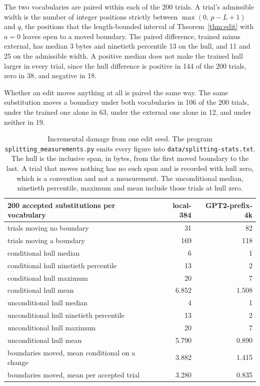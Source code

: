 \documentclass[11pt,a4paper]{article}
\theoremstyle{definition}
\theoremstyle{plain}
\newcommand{\code}[1]{\texttt{#1}}
\begin{document}
The two vocabularies are paired within each of the 200 trials. A trial's admissible width is the number of integer
positions strictly between $\max(0,\, p - L + 1)$ and $q$, the positions that the length-bounded interval of
Theorem~\ref{thm:edit} with $a = 0$ leaves open to a moved boundary. The paired difference, trained minus external, has
median 3 bytes and ninetieth percentile 13 on the hull, and 11 and 25 on the admissible width. A positive median does
not make the trained hull larger in every trial, since the hull difference is positive in 144 of the 200 trials, zero in
38, and negative in 18.

Whether an edit moves anything at all is paired the same way. The same substitution moves a boundary under both
vocabularies in 106 of the 200 trials, under the trained one alone in 63, under the external one alone in 12, and under
neither in 19.

\begin{table}[!htbp]
\centering
\begin{tabular}{@{}lrr@{}}
\toprule
200 accepted substitutions per vocabulary & local-384 & GPT2-prefix-4k \\
\midrule
trials moving no boundary & 31 & 82 \\
trials moving a boundary & 169 & 118 \\
\midrule
conditional hull median & 6 & 1 \\
conditional hull ninetieth percentile & 13 & 2 \\
conditional hull maximum & 20 & 7 \\
conditional hull mean & 6.852 & 1.508 \\
\midrule
unconditional hull median & 4 & 1 \\
unconditional hull ninetieth percentile & 13 & 2 \\
unconditional hull maximum & 20 & 7 \\
unconditional hull mean & 5.790 & 0.890 \\
\midrule
boundaries moved, mean conditional on a change & 3.882 & 1.415 \\
boundaries moved, mean per accepted trial & 3.280 & 0.835 \\
\bottomrule
\end{tabular}
\caption{Incremental damage from one edit seed. The program \code{splitting\_measurements.py} emits every figure into
\code{data/splitting-stats.txt}. The hull is the inclusive span, in bytes, from the first moved boundary to the last. A
trial that moves nothing has no such span and is recorded with hull zero, which is a convention and not a measurement.
The unconditional median, ninetieth percentile, maximum and mean include those trials at hull zero.}
\label{tab:edit}
\end{table}
\end{document}
